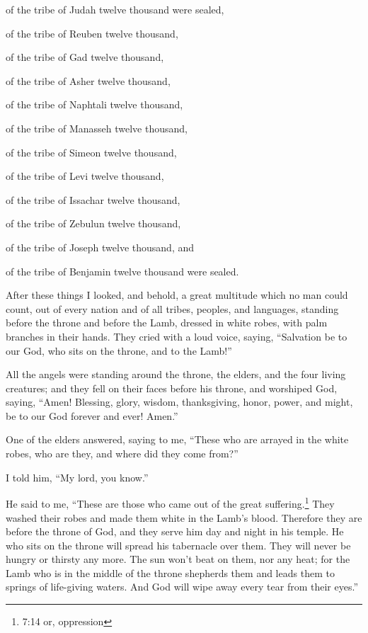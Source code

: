 \myverse{}of the tribe of Judah twelve thousand were sealed,

of the tribe of Reuben twelve thousand,

of the tribe of Gad twelve thousand,

\myverse{}of the tribe of Asher twelve thousand,

of the tribe of Naphtali twelve thousand,

of the tribe of Manasseh twelve thousand,

\myverse{}of the tribe of Simeon twelve thousand,

of the tribe of Levi twelve thousand,

of the tribe of Issachar twelve thousand,

\myverse{}of the tribe of Zebulun twelve thousand,

of the tribe of Joseph twelve thousand, and

of the tribe of Benjamin twelve thousand were sealed.

\myverse{}After these things I looked, and behold, a great multitude which
no man could count, out of every nation and of all tribes, peoples, and languages, standing before the
throne and before the Lamb, dressed in white robes, with palm branches in their hands.
\myverse{}They cried with a loud voice, saying, “Salvation be to our God, who sits on
the throne, and to the Lamb!”

\myverse{}All the angels were standing around the throne, the elders, and
the four living creatures; and they fell on their faces before his throne, and worshiped God,
\myverse{}saying, “Amen! Blessing, glory, wisdom, thanksgiving, honor, power, and might,
be to our God forever and ever! Amen.”

\myverse{}One of the elders answered, saying to me, “These who are arrayed
in the white robes, who are they, and where did they come from?”

\myverse{}I told him, “My lord, you know.”

He said to me, “These are those who came out of the great suffering.\footnote{7:14 or, oppression} They washed their robes and made them white in the Lamb’s blood.
\myverse{}Therefore they are before the throne of God, and they serve him day and night
in his temple. He who sits on the throne will spread his tabernacle over them.
\myverse{}They will never be hungry or thirsty any more. The sun won’t beat on them,
nor any heat;
\myverse{}for the Lamb who is in the middle of the throne shepherds them and leads them
to springs of life-giving waters. And God will wipe away every tear from their eyes.”



